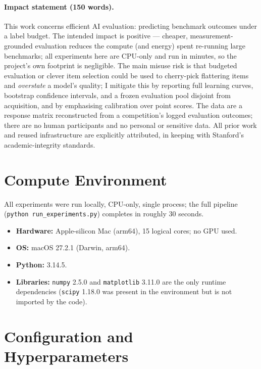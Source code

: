 \documentclass{article}
\begin{document}
\paragraph{Impact statement (150 words).}
This work concerns efficient AI evaluation: predicting benchmark outcomes under a
label budget. The intended impact is positive --- cheaper, measurement-grounded
evaluation reduces the compute (and energy) spent re-running large benchmarks;
all experiments here are CPU-only and run in minutes, so the project's own
footprint is negligible. The main misuse risk is that budgeted evaluation or
clever item selection could be used to cherry-pick flattering items and
\emph{overstate} a model's quality; I mitigate this by reporting full learning
curves, bootstrap confidence intervals, and a frozen evaluation pool disjoint
from acquisition, and by emphasising calibration over point scores. The data are
a response matrix reconstructed from a competition's logged evaluation outcomes;
there are no human participants and no personal or sensitive data. All prior work
and reused infrastructure are explicitly attributed, in keeping with Stanford's
academic-integrity standards.




\appendix

\section{Compute Environment}
All experiments were run locally, CPU-only, single process; the full pipeline
(\texttt{python run\_experiments.py}) completes in roughly $30$ seconds.

\begin{itemize}
  \item \textbf{Hardware:} Apple-silicon Mac (arm64), 15 logical cores; no GPU used.
  \item \textbf{OS:} macOS 27.2.1 (Darwin, arm64).
  \item \textbf{Python:} 3.14.5.
  \item \textbf{Libraries:} \texttt{numpy} 2.5.0 and \texttt{matplotlib} 3.11.0
  are the only runtime dependencies (\texttt{scipy} 1.18.0 was present in the
  environment but is not imported by the code).
\end{itemize}

\section{Configuration and Hyperparameters}
\end{document}
